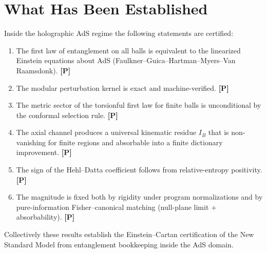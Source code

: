 \documentclass[11pt]{article}
\newcommand{\pP}{\textbf{[P]}}
\begin{document}
\section{What Has Been Established}
Inside the holographic AdS regime the following statements are certified:
\begin{enumerate}[leftmargin=1.6em]
\item The first law of entanglement on all balls is equivalent to the
linearized Einstein equations about AdS (Faulkner--Guica--Hartman--Myers--Van
Raamsdonk). \pP{}
\item The modular perturbation kernel is exact and machine-verified. \pP{}
\item The metric sector of the torsionful first law for finite balls is
unconditional by the conformal selection rule. \pP{}
\item The axial channel produces a universal kinematic residue $I_B$ that
is non-vanishing for finite regions and absorbable into a finite
dictionary improvement. \pP{}
\item The sign of the Hehl--Datta coefficient follows from relative-entropy
positivity. \pP{}
\item The magnitude is fixed both by rigidity under program normalizations
and by pure-information Fisher--canonical matching (null-plane limit +
absorbability). \pP{}
\end{enumerate}
Collectively these results establish the Einstein--Cartan certification
of the New Standard Model from entanglement bookkeeping inside the AdS
domain.
\end{document}
